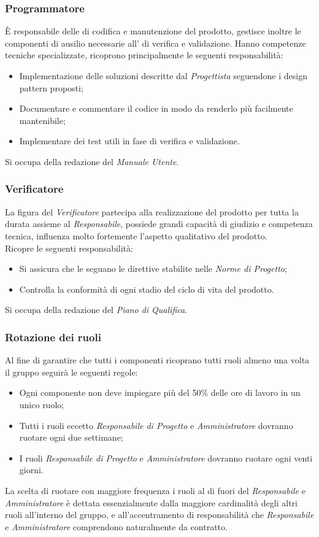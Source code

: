 \documentclass{scalatekids-article}
\begin{document}
\subsubsection{Programmatore}
È responsabile delle  di codifica e manutenzione del prodotto, gestisce
inoltre le componenti di ausilio necessarie all' di verifica e
validazione. Hanno competenze tecniche specializzate, ricoprono principalmente
le seguenti responsabilità:
\begin{itemize}
\item Implementazione delle soluzioni descritte dal \textit{Progettista}
  seguendone i design pattern proposti;
\item Documentare e commentare il codice in modo da renderlo più facilmente
  mantenibile;
\item Implementare dei test utili in fase di verifica e validazione.
\end{itemize}
Si occupa della redazione del \textit{Manuale Utente}.
\subsubsection{Verificatore}
La figura del \textit{Verificatore} partecipa alla realizzazione del prodotto per
tutta la durata assieme al \textit{Responsabile}, possiede grandi capacità di
giudizio e competenza tecnica, influenza molto fortemente l'aspetto qualitativo
del prodotto.\\ Ricopre le seguenti responsabilità:
\begin{itemize}
\item Si assicura che le  seguano le direttive stabilite nelle \textit{Norme di Progetto};
\item Controlla la conformità di ogni stadio del ciclo di vita del prodotto.
\end{itemize}
Si occupa della redazione del \textit{Piano di Qualifica}.
\subsubsection{Rotazione dei ruoli}
Al fine di garantire che tutti i componenti ricoprano tutti ruoli almeno una volta il gruppo seguirà le seguenti regole:
\begin{itemize}
\item Ogni componente non deve impiegare più del 50\% delle ore di lavoro in un unico ruolo;
\item Tutti i ruoli eccetto \textit{Responsabile di Progetto} e \textit{Amministratore} dovranno ruotare ogni due settimane;
\item I ruoli \textit{Responsabile di Progetto} e \textit{Amministratore} dovranno ruotare ogni venti giorni.
\end{itemize}
La scelta di ruotare con maggiore frequenza i ruoli al di fuori del
\textit{Responsabile} e \textit{Amministratore} è dettata essenzialmente dalla
maggiore cardinalità degli altri ruoli all'interno del gruppo, e
all'accentramento di responsabilità che \textit{Responsabile} e
\textit{Amministratore} comprendono naturalmente da contratto.
\end{document}
